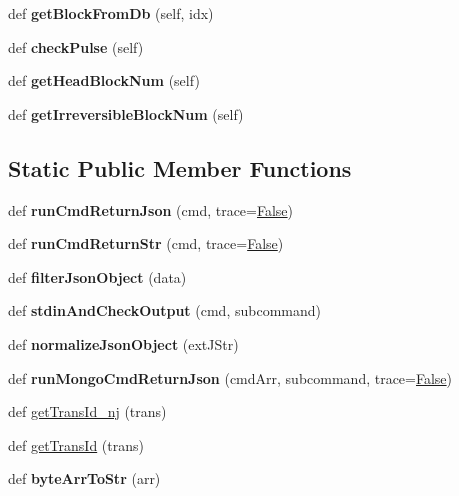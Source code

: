 \begin{DoxyCompactItemize}
def {\bfseries get\+Block\+From\+Db} (self, idx)
\item 
\mbox{\label{classtest_utils_1_1_node_a931ac3d6547c55c4ea0bd6a5530b8274}} 
def {\bfseries check\+Pulse} (self)
\item 
\mbox{\label{classtest_utils_1_1_node_a448472657c3fa88392c9e4b242e9bc09}} 
def {\bfseries get\+Head\+Block\+Num} (self)
\item 
\mbox{\label{classtest_utils_1_1_node_a8edcb3e909400f08c979942fb25aba74}} 
def {\bfseries get\+Irreversible\+Block\+Num} (self)
\end{DoxyCompactItemize}
\subsection*{Static Public Member Functions}
\begin{DoxyCompactItemize}
\item 
\mbox{\label{classtest_utils_1_1_node_aee02c0e65e224873719c3f60678270fd}} 
def {\bfseries run\+Cmd\+Return\+Json} (cmd, trace=\mbox{\hyperlink{struct_false}{False}})
\item 
\mbox{\label{classtest_utils_1_1_node_ab14dcb7fadfa21ede5f547a00856d1f6}} 
def {\bfseries run\+Cmd\+Return\+Str} (cmd, trace=\mbox{\hyperlink{struct_false}{False}})
\item 
\mbox{\label{classtest_utils_1_1_node_a28908cdf0a26ffa16eab861a84db8f99}} 
def {\bfseries filter\+Json\+Object} (data)
\item 
\mbox{\label{classtest_utils_1_1_node_a4b99cf58c6638016868c5d933b5e46a4}} 
def {\bfseries stdin\+And\+Check\+Output} (cmd, subcommand)
\item 
\mbox{\label{classtest_utils_1_1_node_a6561b66934beefc5c324be649ba7bb82}} 
def {\bfseries normalize\+Json\+Object} (ext\+J\+Str)
\item 
\mbox{\label{classtest_utils_1_1_node_a1815fe3aa01daa4a4d30eed1c9210fa9}} 
def {\bfseries run\+Mongo\+Cmd\+Return\+Json} (cmd\+Arr, subcommand, trace=\mbox{\hyperlink{struct_false}{False}})
\item 
def \mbox{\hyperlink{classtest_utils_1_1_node_a32b34acdb7d8e016235fd84ce3045311}{get\+Trans\+Id\+\_\+nj}} (trans)
\item 
def \mbox{\hyperlink{classtest_utils_1_1_node_ae532544a53c9e9b8afe53cc04cb9f8a5}{get\+Trans\+Id}} (trans)
\item 
\mbox{\label{classtest_utils_1_1_node_afff5ef0f75cf9a4a72fdbd32194d00c8}} 
def {\bfseries byte\+Arr\+To\+Str} (arr)
\end{DoxyCompactItemize}
